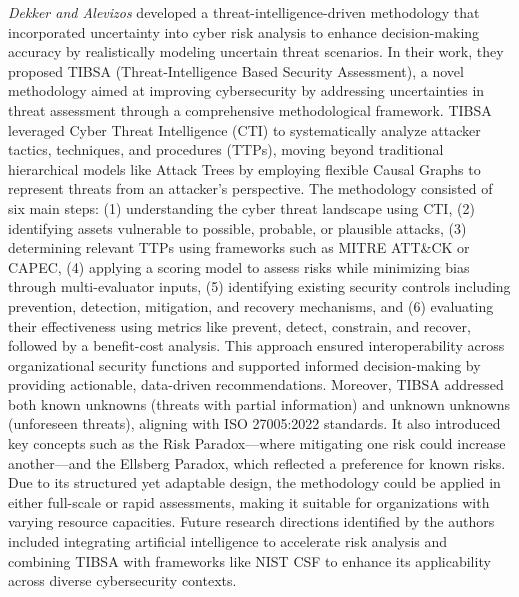 \textit{Dekker and Alevizos} developed a threat-intelligence-driven methodology that incorporated uncertainty into cyber risk analysis to enhance decision-making accuracy by realistically modeling uncertain threat scenarios. In their work, they proposed TIBSA (Threat-Intelligence Based Security Assessment), a novel methodology aimed at improving cybersecurity by addressing uncertainties in threat assessment through a comprehensive methodological framework. TIBSA leveraged Cyber Threat Intelligence (CTI) to systematically analyze attacker tactics, techniques, and procedures (TTPs), moving beyond traditional hierarchical models like Attack Trees by employing flexible Causal Graphs to represent threats from an attacker's perspective. The methodology consisted of six main steps: (1) understanding the cyber threat landscape using CTI, (2) identifying assets vulnerable to possible, probable, or plausible attacks, (3) determining relevant TTPs using frameworks such as MITRE ATT\&CK or CAPEC, (4) applying a scoring model to assess risks while minimizing bias through multi-evaluator inputs, (5) identifying existing security controls including prevention, detection, mitigation, and recovery mechanisms, and (6) evaluating their effectiveness using metrics like prevent, detect, constrain, and recover, followed by a benefit-cost analysis. This approach ensured interoperability across organizational security functions and supported informed decision-making by providing actionable, data-driven recommendations. Moreover, TIBSA addressed both known unknowns (threats with partial information) and unknown unknowns (unforeseen threats), aligning with ISO 27005:2022 standards. It also introduced key concepts such as the Risk Paradox—where mitigating one risk could increase another—and the Ellsberg Paradox, which reflected a preference for known risks. Due to its structured yet adaptable design, the methodology could be applied in either full-scale or rapid assessments, making it suitable for organizations with varying resource capacities. Future research directions identified by the authors included integrating artificial intelligence to accelerate risk analysis and combining TIBSA with frameworks like NIST CSF to enhance its applicability across diverse cybersecurity contexts. \cite{dekker2023}

